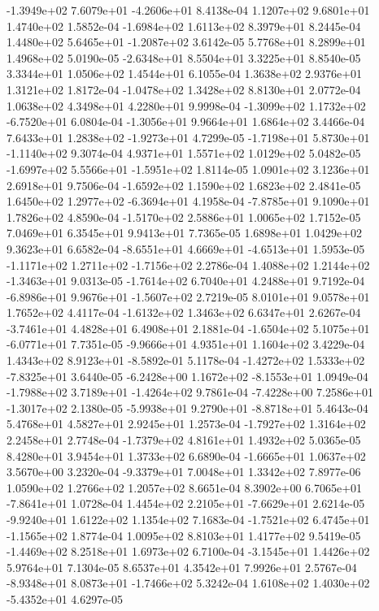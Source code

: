 -1.3949e+02  7.6079e+01 -4.2606e+01  8.4138e-04
1.1207e+02 9.6801e+01 1.4740e+02  1.5852e-04
-1.6984e+02  1.6113e+02  8.3979e+01  8.2445e-04
 1.4480e+02  5.6465e+01 -1.2087e+02  3.6142e-05
5.7768e+01 8.2899e+01 1.4968e+02  5.0190e-05
-2.6348e+01  8.5504e+01  3.3225e+01  8.8540e-05
3.3344e+01 1.0506e+02 1.4544e+01  6.1055e-04
1.3638e+02 2.9376e+01 1.3121e+02  1.8172e-04
-1.0478e+02  1.3428e+02  8.8130e+01  2.0772e-04
1.0638e+02 4.3498e+01 4.2280e+01  9.9998e-04
-1.3099e+02  1.1732e+02 -6.7520e+01  6.0804e-04
-1.3056e+01  9.9664e+01  1.6864e+02  3.4466e-04
 7.6433e+01  1.2838e+02 -1.9273e+01  4.7299e-05
-1.7198e+01  5.8730e+01 -1.1140e+02  9.3074e-04
4.9371e+01 1.5571e+02 1.0129e+02  5.0482e-05
-1.6997e+02  5.5566e+01 -1.5951e+02  1.8114e-05
1.0901e+02 3.1236e+01 2.6918e+01  9.7506e-04
-1.6592e+02  1.1590e+02  1.6823e+02  2.4841e-05
 1.6450e+02  1.2977e+02 -6.3694e+01  4.1958e-04
-7.8785e+01  9.1090e+01  1.7826e+02  4.8590e-04
-1.5170e+02  2.5886e+01  1.0065e+02  1.7152e-05
7.0469e+01 6.3545e+01 9.9413e+01  7.7365e-05
1.6898e+01 1.0429e+02 9.3623e+01  6.6582e-04
-8.6551e+01  4.6669e+01 -4.6513e+01  1.5953e-05
-1.1171e+02  1.2711e+02 -1.7156e+02  2.2786e-04
 1.4088e+02  1.2144e+02 -1.3463e+01  9.0313e-05
-1.7614e+02  6.7040e+01  4.2488e+01  9.7192e-04
-6.8986e+01  9.9676e+01 -1.5607e+02  2.7219e-05
8.0101e+01 9.0578e+01 1.7652e+02  4.4117e-04
-1.6132e+02  1.3463e+02  6.6347e+01  2.6267e-04
-3.7461e+01  4.4828e+01  6.4908e+01  2.1881e-04
-1.6504e+02  5.1075e+01 -6.0771e+01  7.7351e-05
-9.9666e+01  4.9351e+01  1.1604e+02  3.4229e-04
 1.4343e+02  8.9123e+01 -8.5892e-01  5.1178e-04
-1.4272e+02  1.5333e+02 -7.8325e+01  3.6440e-05
-6.2428e+00  1.1672e+02 -8.1553e+01  1.0949e-04
-1.7988e+02  3.7189e+01 -1.4264e+02  9.7861e-04
-7.4228e+00  7.2586e+01 -1.3017e+02  2.1380e-05
-5.9938e+01  9.2790e+01 -8.8718e+01  5.4643e-04
5.4768e+01 4.5827e+01 2.9245e+01  1.2573e-04
-1.7927e+02  1.3164e+02  2.2458e+01  2.7748e-04
-1.7379e+02  4.8161e+01  1.4932e+02  5.0365e-05
8.4280e+01 3.9454e+01 1.3733e+02  6.6890e-04
-1.6665e+01  1.0637e+02  3.5670e+00  3.2320e-04
-9.3379e+01  7.0048e+01  1.3342e+02  7.8977e-06
1.0590e+02 1.2766e+02 1.2057e+02  8.6651e-04
 8.3902e+00  6.7065e+01 -7.8641e+01  1.0728e-04
 1.4454e+02  2.2105e+01 -7.6629e+01  2.6214e-05
-9.9240e+01  1.6122e+02  1.1354e+02  7.1683e-04
-1.7521e+02  6.4745e+01 -1.1565e+02  1.8774e-04
1.0095e+02 8.8103e+01 1.4177e+02  9.5419e-05
-1.4469e+02  8.2518e+01  1.6973e+02  6.7100e-04
-3.1545e+01  1.4426e+02  5.9764e+01  7.1304e-05
8.6537e+01 4.3542e+01 7.9926e+01  2.5767e-04
-8.9348e+01  8.0873e+01 -1.7466e+02  5.3242e-04
 1.6108e+02  1.4030e+02 -5.4352e+01  4.6297e-05
